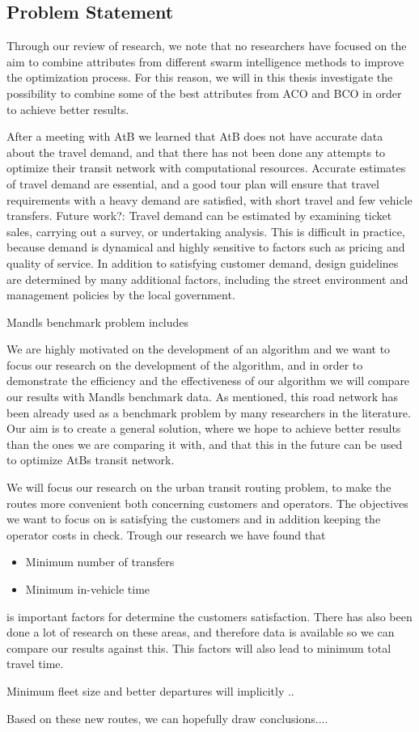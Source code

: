 \subsection{Problem Statement}
Through our review of research, we note that no researchers have focused on the aim to combine attributes from different swarm intelligence methods to improve the optimization process. For this reason, we will in this thesis investigate the possibility to combine some of the best attributes from ACO and BCO in order to achieve better results.

After a meeting with AtB we learned that AtB does not have accurate data about the travel demand, and that there has not been done any attempts to optimize their transit network with computational resources. Accurate estimates of travel demand are essential, and a good tour plan will ensure that travel requirements with a heavy demand are satisfied, with short travel and few vehicle transfers. Future work?: Travel demand can be estimated by examining ticket sales, carrying out a survey, or undertaking analysis. This is difficult in practice, because demand is dynamical and highly sensitive to factors such as pricing and quality of service. In addition to satisfying customer demand, design guidelines are determined by many additional factors, including the street environment and management policies by the local government.

Mandls benchmark problem includes 

We are highly motivated on the development of an algorithm and we want to focus our research on the development of the algorithm, and in order to demonstrate the efficiency and the effectiveness of our algorithm we will compare our results with Mandls benchmark data. As mentioned, this road network has been already used as a benchmark problem by many researchers in the literature. Our aim is to create a general solution, where we hope to achieve better results than the ones we are comparing it with, and that this in the future can be used to optimize AtBs transit network. 

We will focus our research on the urban transit routing problem, to make the routes more convenient both concerning customers and operators. The objectives we want to focus on is satisfying the customers and in addition keeping the operator costs in check. Trough our research we have found that 
\begin{itemize}
\item Minimum number of transfers
\item Minimum in-vehicle time
\end{itemize}
is important factors for determine the customers satisfaction. There has also been done a lot of research on these areas, and therefore data is available so we can compare our results against this. This factors will also lead to minimum total travel time. 
\par
Minimum fleet size and better departures will implicitly ..
\par
Based on these new routes, we can hopefully draw conclusions....
